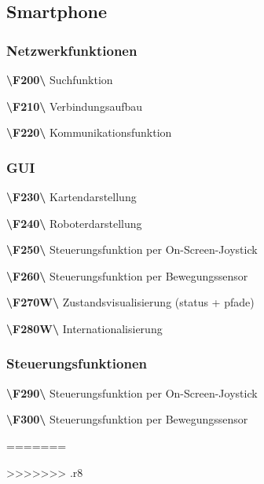 \documentclass[10pt,a4paper]{article}
\begin{document}
		\subsection{Smartphone}
			\subsubsection{Netzwerkfunktionen}
				\begin{list}{}{\leftmargin=1cm}
					\item[\textbf{\textbackslash F200\textbackslash}] Suchfunktion
					\item[\textbf{\textbackslash F210\textbackslash}] Verbindungsaufbau					
					\item[\textbf{\textbackslash F220\textbackslash}] Kommunikationsfunktion
				\end{list}				
			\subsubsection{GUI}
				\begin{list}{}{\leftmargin=1cm}
					\item[\textbf{\textbackslash F230\textbackslash}] Kartendarstellung
					\item[\textbf{\textbackslash F240\textbackslash}] Roboterdarstellung					
					\item[\textbf{\textbackslash F250\textbackslash}] Steuerungsfunktion per On-Screen-Joystick
					\item[\textbf{\textbackslash F260\textbackslash}] Steuerungsfunktion per Bewegungssensor					
					\item[\textbf{\textbackslash F270W\textbackslash}] Zustandsvisualisierung (status + pfade)		
					\item[\textbf{\textbackslash F280W\textbackslash}] Internationalisierung	
				\end{list}		
			\subsubsection{Steuerungsfunktionen}		
				\begin{list}{}{\leftmargin=1cm}
					\item[\textbf{\textbackslash F290\textbackslash}] Steuerungsfunktion per On-Screen-Joystick
					\item[\textbf{\textbackslash F300\textbackslash}] Steuerungsfunktion per Bewegungssensor					
				\end{list}				
=======
			
			
>>>>>>> .r8
\end{document}
